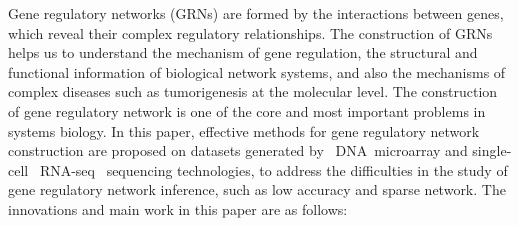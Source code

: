 \begin{abstracten}


Gene regulatory networks (GRNs) are formed by the interactions between genes, 
which reveal their complex regulatory relationships. 
The construction of GRNs helps us to understand the mechanism of gene regulation, the structural and functional information of biological network systems, and also the mechanisms of complex diseases such as tumorigenesis at the molecular level.
The construction of gene regulatory network is one of the core and most important problems in systems biology.
In this paper, effective methods for gene regulatory network construction are proposed on datasets generated by ~DNA~microarray and single-cell ~RNA-seq~ sequencing technologies, 
to address  the difficulties in the study of gene regulatory network inference, such as low accuracy and sparse network.
The innovations and main work in this paper are as follows:



\end{abstracten}

